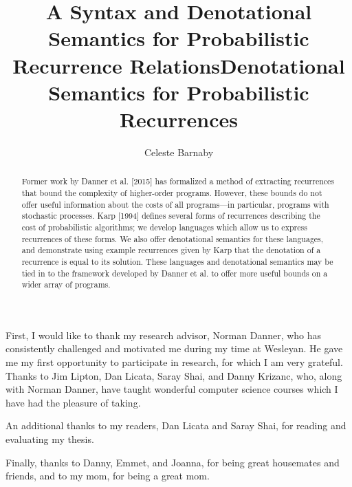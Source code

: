 \documentclass[12pt]{westhesis}
\title{A Syntax and Denotational Semantics for Probabilistic Recurrence Relations}
\theoremstyle{plain}
\theoremstyle{definition}
\begin{document}
\begin{abstract}
Former work by Danner et al. [2015] has formalized a method of extracting recurrences that bound the complexity
of higher-order programs. However, these bounds do not offer useful information about the costs of all programs---in particular,
programs with stochastic processes. Karp [1994] defines several forms of recurrences describing the cost of probabilistic
algorithms; we develop languages which allow us to express recurrences of these forms. We also offer denotational semantics for these languages, and demonstrate using example recurrences given by Karp that the denotation of a recurrence is equal to its solution. These languages and denotational semantics may be tied in to the framework developed by Danner et al. to offer
more useful bounds on a wider array of programs.
\end{abstract}

\begin{acknowledgements}

First, I would like to thank my research advisor, Norman Danner, who has consistently challenged and motivated me during my time at Wesleyan. He gave me my first opportunity to participate in research, for which I am very grateful. 
Thanks to Jim Lipton, Dan Licata, Saray Shai, and Danny Krizanc, who, along with Norman Danner, have
taught wonderful computer science courses which I have had the pleasure of taking. 

An additional thanks to my readers, Dan Licata and Saray Shai, for reading and evaluating my thesis. 

Finally, thanks to Danny, Emmet, and Joanna, for being great housemates and friends, and to my mom, for being a great mom. 

\end{acknowledgements}

\title{Denotational Semantics for Probabilistic Recurrences}
\author{Celeste Barnaby}

\maketitle
\makeack
\makeabstract
\tableofcontents









\end{document}
